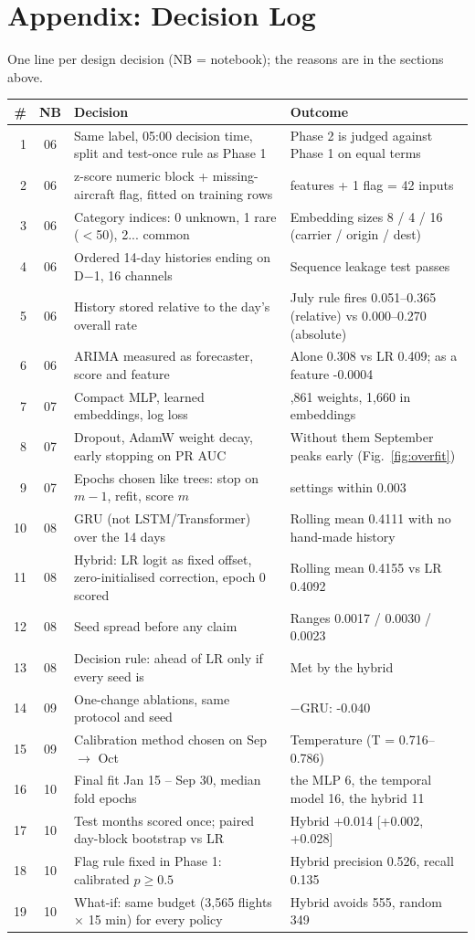 \documentclass[conference]{IEEEtran}
\begin{document}
\section*{Appendix: Decision Log}
One line per design decision (NB = notebook); the reasons are in the sections above.
\footnotesize
\begin{longtable}{@{}r c >{\raggedright\arraybackslash}p{3.0in} >{\raggedright\arraybackslash}p{3.2in}@{}}
\toprule
\# & NB & Decision & Outcome\\\midrule\endhead
1 & 06 & Same label, 05:00 decision time, split and test-once rule as Phase 1 & Phase 2 is judged against Phase 1 on equal terms\\
2 & 06 & z-score numeric block + missing-aircraft flag, fitted on training rows & 41 features + 1 flag = 42 inputs\\
3 & 06 & Category indices: 0 unknown, 1 rare ($<$50), 2... common & Embedding sizes 8 / 4 / 16 (carrier / origin / dest)\\
4 & 06 & Ordered 14-day histories ending on D$-$1, 16 channels & Sequence leakage test passes\\
5 & 06 & History stored relative to the day's overall rate & July rule fires 0.051--0.365 (relative) vs 0.000--0.270 (absolute)\\
6 & 06 & ARIMA measured as forecaster, score and feature & Alone 0.308 vs LR 0.409; as a feature -0.0004\\
7 & 07 & Compact MLP, learned embeddings, log loss & 52,861 weights, 1,660 in embeddings\\
8 & 07 & Dropout, AdamW weight decay, early stopping on PR AUC & Without them September peaks early (Fig.~\ref{fig:overfit})\\
9 & 07 & Epochs chosen like trees: stop on $m-1$, refit, score $m$ & 8 settings within 0.003\\
10 & 08 & GRU (not LSTM/Transformer) over the 14 days & Rolling mean 0.4111 with no hand-made history\\
11 & 08 & Hybrid: LR logit as fixed offset, zero-initialised correction, epoch 0 scored & Rolling mean 0.4155 vs LR 0.4092\\
12 & 08 & Seed spread before any claim & Ranges 0.0017 / 0.0030 / 0.0023\\
13 & 08 & Decision rule: ahead of LR only if every seed is & Met by the hybrid\\
14 & 09 & One-change ablations, same protocol and seed & $-$GRU: -0.040\\
15 & 09 & Calibration method chosen on Sep $\rightarrow$ Oct & Temperature (T = 0.716--0.786)\\
16 & 10 & Final fit Jan 15 -- Sep 30, median fold epochs & the MLP 6, the temporal model 16, the hybrid 11\\
17 & 10 & Test months scored once; paired day-block bootstrap vs LR & Hybrid +0.014 [+0.002, +0.028]\\
18 & 10 & Flag rule fixed in Phase 1: calibrated $p \geq 0.5$ & Hybrid precision 0.526, recall 0.135\\
19 & 10 & What-if: same budget (3,565 flights $\times$ 15 min) for every policy & Hybrid avoids 555, random 349\\
\bottomrule
\end{longtable}
\end{document}
